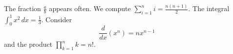 The fraction $\frac{a}{b}$ appears often.
We compute $\sum_{i=1}^{n} i = \frac{n(n+1)}{2}$.
The integral $\int_0^1 x^2 \, dx = \frac{1}{3}$.
Consider
$$\frac{d}{dx} \left( x^n \right) = nx^{n-1}$$
and the product $\prod_{k=1}^{n} k = n!$.
